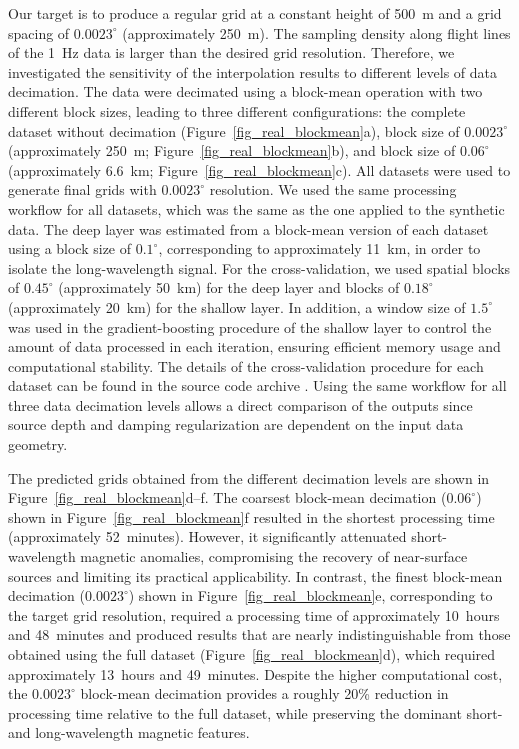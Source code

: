 Our target is to produce a regular grid at a constant height of 500~m and
a grid spacing of $0.0023^{\circ}$ (approximately 250~m).
The sampling density along flight lines of the 1~Hz data is larger than the
desired grid resolution.
Therefore, we investigated the sensitivity of the interpolation results to
different levels of data decimation.
The data were decimated using a block-mean operation with
two different block sizes, leading to three different configurations:
the complete dataset without decimation (Figure~\ref{fig_real_blockmean}a),
block size of $0.0023^{\circ}$ (approximately 250~m;
Figure~\ref{fig_real_blockmean}b), and
block size of $0.06^{\circ}$ (approximately 6.6~km; Figure~\ref{fig_real_blockmean}c). All
datasets were used to generate final grids with $0.0023^{\circ}$ resolution.
We used the same processing workflow for all datasets, which was the same as
the one applied to the synthetic data.
The deep layer was estimated from a block-mean version of each
dataset using a block size of $0.1^{\circ}$, corresponding to approximately
11~km, in order to isolate the long-wavelength signal.
For the cross-validation, we used
spatial blocks of $0.45^{\circ}$ (approximately 50~km) for the deep layer
and blocks of $0.18^{\circ}$ (approximately 20~km) for the shallow layer.
In addition, a window size of $1.5^{\circ}$ was used in the
gradient-boosting procedure of the shallow layer to control the amount of data
processed in each iteration, ensuring efficient memory usage and computational
stability.
The details of the cross-validation procedure for each dataset can be found in
the source code archive \citep{archive}.
Using the same workflow for all three data decimation levels allows a direct
comparison of the outputs since source depth and damping regularization are
dependent on the input data geometry.

The predicted grids obtained from the different decimation
levels are shown in Figure~\ref{fig_real_blockmean}d--f.
The coarsest block-mean decimation ($0.06^{\circ}$) shown in
Figure~\ref{fig_real_blockmean}f resulted in the shortest
processing time (approximately 52~minutes).
However, it significantly attenuated short-wavelength magnetic anomalies,
compromising the recovery of near-surface sources and limiting its practical
applicability.
In contrast, the finest block-mean decimation ($0.0023^{\circ}$) shown in
Figure~\ref{fig_real_blockmean}e, corresponding to the target grid resolution,
required a processing time of approximately 10~hours and 48~minutes and
produced results that are nearly indistinguishable from those obtained using
the full dataset (Figure~\ref{fig_real_blockmean}d), which required
approximately 13~hours and 49~minutes.
Despite the higher computational cost, the $0.0023^{\circ}$ block-mean
decimation provides a roughly 20\% reduction in processing time relative to the
full dataset, while preserving the dominant short- and long-wavelength magnetic
features.

